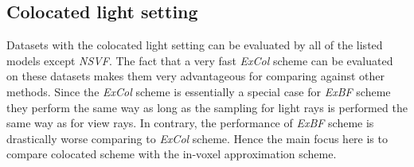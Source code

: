 \subsection{Colocated light setting}
\label{subsec:experiments_coloc}

Datasets with the colocated light setting can be evaluated by all of the listed models except \textit{NSVF}.
The fact that a very fast \textit{ExCol} scheme can be evaluated on these datasets
makes them very advantageous for comparing against other methods.
Since the \textit{ExCol} scheme is essentially a special case for \textit{ExBF} scheme
they perform the same way as long as the sampling for light rays is performed the same way as for view rays.
In contrary, the performance of \textit{ExBF} scheme is drastically worse comparing to \textit{ExCol} scheme.
Hence the main focus here is to compare colocated scheme with the in-voxel approximation scheme.





